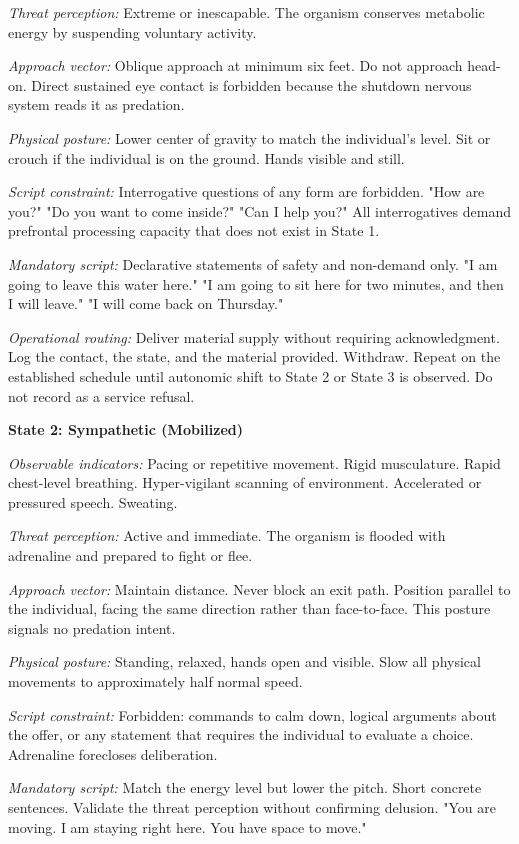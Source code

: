 \documentclass[12pt, letterpaper]{article}
\begin{document}
\textit{Threat perception:} Extreme or inescapable. The organism conserves metabolic energy by suspending voluntary activity.

\textit{Approach vector:} Oblique approach at minimum six feet. Do not approach head-on. Direct sustained eye contact is forbidden because the shutdown nervous system reads it as predation.

\textit{Physical posture:} Lower center of gravity to match the individual's level. Sit or crouch if the individual is on the ground. Hands visible and still.

\textit{Script constraint:} Interrogative questions of any form are forbidden. "How are you?" "Do you want to come inside?" "Can I help you?" All interrogatives demand prefrontal processing capacity that does not exist in State 1.

\textit{Mandatory script:} Declarative statements of safety and non-demand only. "I am going to leave this water here." "I am going to sit here for two minutes, and then I will leave." "I will come back on Thursday."

\textit{Operational routing:} Deliver material supply without requiring acknowledgment. Log the contact, the state, and the material provided. Withdraw. Repeat on the established schedule until autonomic shift to State 2 or State 3 is observed. Do not record as a service refusal.

\textbf{State 2: Sympathetic (Mobilized)}

\textit{Observable indicators:} Pacing or repetitive movement. Rigid musculature. Rapid chest-level breathing. Hyper-vigilant scanning of environment. Accelerated or pressured speech. Sweating.

\textit{Threat perception:} Active and immediate. The organism is flooded with adrenaline and prepared to fight or flee.

\textit{Approach vector:} Maintain distance. Never block an exit path. Position parallel to the individual, facing the same direction rather than face-to-face. This posture signals no predation intent.

\textit{Physical posture:} Standing, relaxed, hands open and visible. Slow all physical movements to approximately half normal speed.

\textit{Script constraint:} Forbidden: commands to calm down, logical arguments about the offer, or any statement that requires the individual to evaluate a choice. Adrenaline forecloses deliberation.

\textit{Mandatory script:} Match the energy level but lower the pitch. Short concrete sentences. Validate the threat perception without confirming delusion. "You are moving. I am staying right here. You have space to move."
\end{document}
